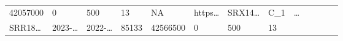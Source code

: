 \documentclass[
]{article}
\begin{document}
\begin{longtable}[]{@{}lllllllllllll@{}}
\begin{minipage}[t]{0.05\columnwidth}
42057000\strut
\end{minipage} & \begin{minipage}[t]{0.05\columnwidth}\raggedright
0\strut
\end{minipage} & \begin{minipage}[t]{0.05\columnwidth}\raggedright
500\strut
\end{minipage} & \begin{minipage}[t]{0.05\columnwidth}\raggedright
13\strut
\end{minipage} & \begin{minipage}[t]{0.05\columnwidth}\raggedright
NA\strut
\end{minipage} & \begin{minipage}[t]{0.05\columnwidth}\raggedright
https\ldots{}\strut
\end{minipage} & \begin{minipage}[t]{0.05\columnwidth}\raggedright
SRX14\ldots{}\strut
\end{minipage} & \begin{minipage}[t]{0.08\columnwidth}\raggedright
C\_1\strut
\end{minipage} & \begin{minipage}[t]{0.02\columnwidth}\raggedright
\ldots{}\strut
\end{minipage}\tabularnewline
\begin{minipage}[t]{0.05\columnwidth}\raggedright
SRR18\ldots{}\strut
\end{minipage} & \begin{minipage}[t]{0.05\columnwidth}\raggedright
2023-\ldots{}\strut
\end{minipage} & \begin{minipage}[t]{0.05\columnwidth}\raggedright
2022-\ldots{}\strut
\end{minipage} & \begin{minipage}[t]{0.04\columnwidth}\raggedright
85133\strut
\end{minipage} & \begin{minipage}[t]{0.05\columnwidth}\raggedright
42566500\strut
\end{minipage} & \begin{minipage}[t]{0.05\columnwidth}\raggedright
0\strut
\end{minipage} & \begin{minipage}[t]{0.05\columnwidth}\raggedright
500\strut
\end{minipage} & \begin{minipage}[t]{0.05\columnwidth}\raggedright
13\strut
\end{minipage} & \begin{minipage}[t]{0.05\columnwidth}\raggedright

\end{minipage}
\end{longtable}
\end{document}
